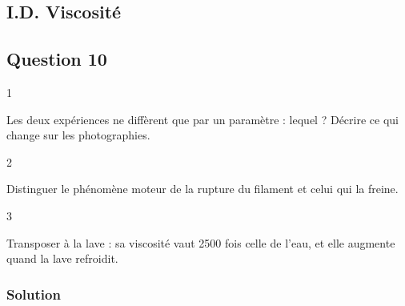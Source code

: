 \documentclass[11pt,a4paper]{article}
\begin{document}
\hypertarget{i.d.-viscosituxe9}{%
\subsection{I.D. Viscosité}\label{i.d.-viscosituxe9}}

\hypertarget{question-10}{%
\subsection{Question 10}\label{question-10}}

\begin{indication}{1}

Les deux expériences ne diffèrent que par un paramètre : lequel ? Décrire ce qui change sur les photographies.

\end{indication}

\begin{indication}{2}

Distinguer le phénomène moteur de la rupture du filament et celui qui la freine.

\end{indication}

\begin{indication}{3}

Transposer à la lave : sa viscosité vaut 2500 fois celle de l'eau, et elle augmente quand la lave refroidit.

\end{indication}

\hypertarget{solution-9}{%
\subsubsection{Solution}\label{solution-9}}
\end{document}

